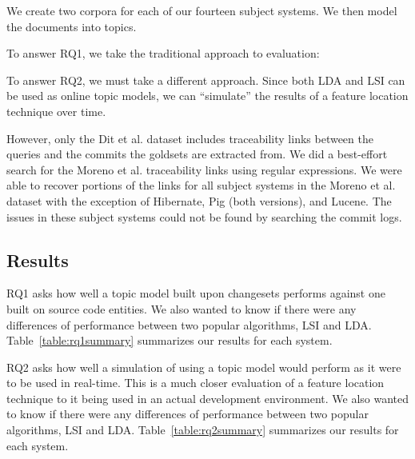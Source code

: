 We create two corpora for each of our fourteen subject systems.
We then model the documents into topics.

To answer RQ1, we take the traditional approach to evaluation:

To answer RQ2, we must take a different approach.
Since both LDA and LSI can be used as online topic models, we can
``simulate'' the results of a feature location technique over time.

However, only the Dit et al. dataset includes traceability links between
the queries and the commits the goldsets are extracted from.
We did a best-effort search for the Moreno et al. traceability links
using regular expressions.
We were able to recover portions of the links for all subject systems in
the Moreno et al. dataset with the exception of Hibernate, Pig (both versions), and Lucene.
The issues in these subject systems could not be found by searching the commit logs.



\subsection{Results}


RQ1 asks how well a topic model built upon changesets performs against
one built on source code entities.
We also wanted to know if there were any differences of performance
between two popular algorithms, LSI and LDA.
Table~\ref{table:rq1summary} summarizes our results for each system.

RQ2 asks how well a simulation of using a topic model would perform as
it were to be used in real-time.
This is a much closer evaluation of a feature location technique to it
being used in an actual development environment.
We also wanted to know if there were any differences of performance
between two popular algorithms, LSI and LDA.
Table~\ref{table:rq2summary} summarizes our results for each system.


